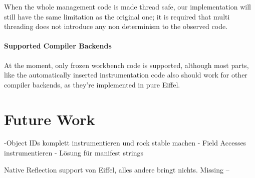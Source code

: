 When the whole management code is made thread safe, our implementation will still have the same limitation as the original one; it is required that multi threading does not introduce any non determinism to the observed code.

\paragraph{Supported Compiler Backends}
At the moment, only frozen workbench code is supported, although most parts, like the automatically inserted instrumentation code also should work for other compiler backends, as they're implemented in pure Eiffel.
\section{Future Work}
-Object IDs komplett instrumentieren und rock stable machen
- Field Accesses instrumentieren
- Lösung für manifest strings

Native Reflection support von Eiffel, alles andere bringt nichts.
Missing 
--



